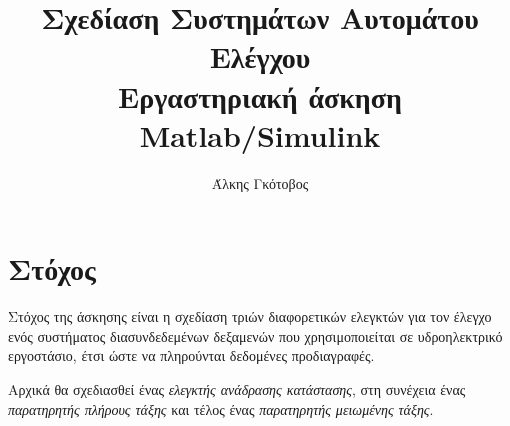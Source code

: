 \documentclass[a4paper, 11pt, english, greek]{article}
\title{Σχεδίαση Συστημάτων Αυτομάτου Ελέγχου \\ \vspace{12pt}
Εργαστηριακή άσκηση \textlatin{Matlab/Simulink}}
\author{Άλκης Γκότοβος}
\begin{document}
\begin{titlepage}
	\maketitle
	\thispagestyle{empty}
\end{titlepage}

\section{Στόχος}
Στόχος της άσκησης είναι η σχεδίαση τριών διαφορετικών ελεγκτών για τον έλεγχο ενός συστήματος διασυνδεδεμένων
δεξαμενών που χρησιμοποιείται σε υδροηλεκτρικό εργοστάσιο, έτσι ώστε να πληρούνται δεδομένες προδιαγραφές.

Αρχικά θα σχεδιασθεί ένας \emph{ελεγκτής ανάδρασης κατάστασης},
στη συνέχεια ένας \emph{παρατηρητής πλήρους τάξης} και
τέλος ένας \emph{παρατηρητής μειωμένης τάξης}.
\end{document}
